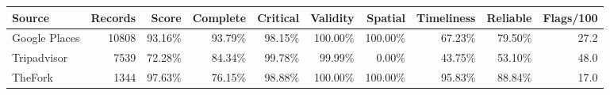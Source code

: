 {\tiny
\begin{tabular}{lrrrrrrrrr}
\toprule
Source & Records & Score & Complete & Critical & Validity & Spatial & Timeliness & Reliable & Flags/100 \\
\midrule
Google Places & 10808 & 93.16\% & 93.79\% & 98.15\% & 100.00\% & 100.00\% & 67.23\% & 79.50\% & 27.2 \\
Tripadvisor & 7539 & 72.28\% & 84.34\% & 99.78\% & 99.99\% & 0.00\% & 43.75\% & 53.10\% & 48.0 \\
TheFork & 1344 & 97.63\% & 76.15\% & 98.88\% & 100.00\% & 100.00\% & 95.83\% & 88.84\% & 17.0 \\
\bottomrule
\end{tabular}
}
